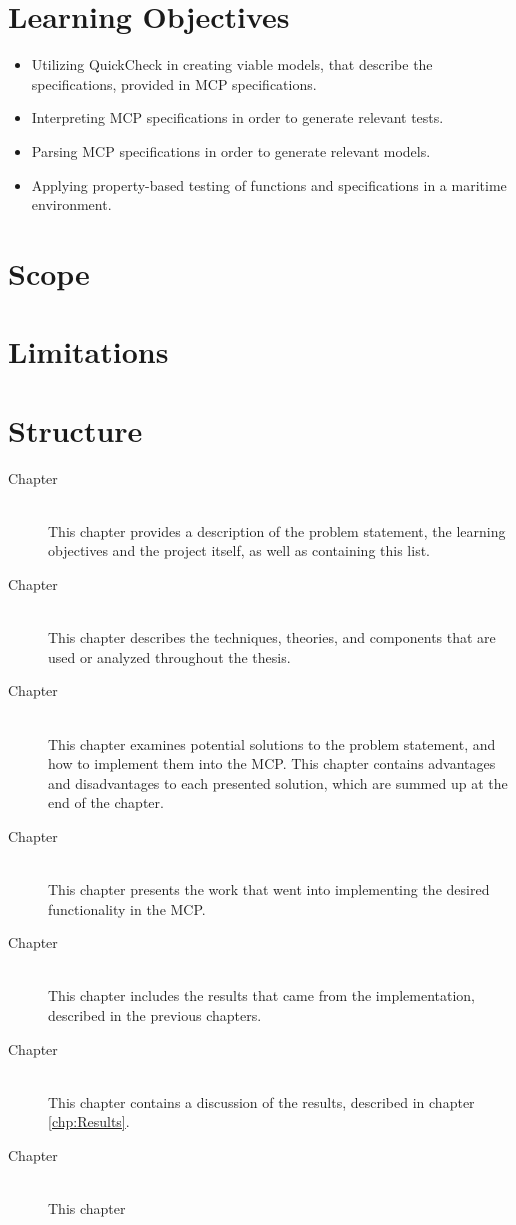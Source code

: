 \section{Learning Objectives}

\begin{itemize}
	\item Utilizing QuickCheck in creating viable models, that describe the specifications, provided in MCP specifications.
	\item Interpreting MCP specifications in order to generate relevant tests.
	\item Parsing MCP specifications in order to generate relevant models.
	\item Applying property-based testing of functions and specifications in a maritime environment.
\end{itemize}

\section{Scope}

\section{Limitations}

\section{Structure}

\begin{description}
	\item[Chapter ]\ \\
	This chapter provides a description of the problem statement, the learning objectives and the project itself, as well as containing this list.
	\item[Chapter ]\ \\
	This chapter describes the techniques, theories, and components that are used or analyzed throughout the thesis.
	\item[Chapter ]\ \\
	This chapter examines potential solutions to the problem statement, and how to implement them into the MCP. This chapter contains advantages and disadvantages to each presented solution, which are summed up at the end of the chapter.
	\item[Chapter ]\ \\
	This chapter presents the work that went into implementing the desired functionality in the MCP.
	\item[Chapter ]\ \\
	This chapter includes the results that came from the implementation, described in the previous chapters.
	\item[Chapter ]\ \\
	This chapter contains a discussion of the results, described in chapter \ref{chp:Results}.
	\item[Chapter ]\ \\
	This chapter
\end{description}